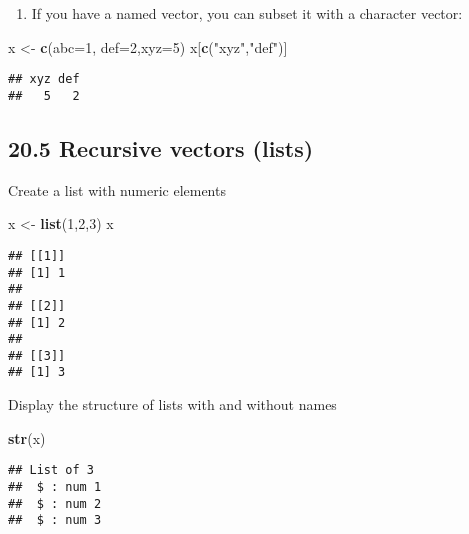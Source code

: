 \documentclass[
]{article}
\newenvironment{Shaded}{\begin{snugshade}}{\end{snugshade}}
\newcommand{\AttributeTok}[1]{\textcolor[rgb]{0.13,0.29,0.53}{#1}}
\newcommand{\DecValTok}[1]{\textcolor[rgb]{0.00,0.00,0.81}{#1}}
\newcommand{\FunctionTok}[1]{\textcolor[rgb]{0.13,0.29,0.53}{\textbf{#1}}}
\newcommand{\NormalTok}[1]{#1}
\newcommand{\OtherTok}[1]{\textcolor[rgb]{0.56,0.35,0.01}{#1}}
\newcommand{\StringTok}[1]{\textcolor[rgb]{0.31,0.60,0.02}{#1}}
\providecommand{\tightlist}{%
  \setlength{\itemsep}{0pt}\setlength{\parskip}{0pt}}
\begin{document}
\begin{enumerate}
\def\labelenumi{\arabic{enumi}.}
\setcounter{enumi}{2}
\tightlist
\item
  If you have a named vector, you can subset it with a character vector:
\end{enumerate}

\begin{Shaded}
\begin{Highlighting}[]
\NormalTok{x }\OtherTok{\textless{}{-}} \FunctionTok{c}\NormalTok{(}\AttributeTok{abc=}\DecValTok{1}\NormalTok{, }\AttributeTok{def=}\DecValTok{2}\NormalTok{,}\AttributeTok{xyz=}\DecValTok{5}\NormalTok{)}
\NormalTok{x[}\FunctionTok{c}\NormalTok{(}\StringTok{"xyz"}\NormalTok{,}\StringTok{"def"}\NormalTok{)]}
\end{Highlighting}
\end{Shaded}

\begin{verbatim}
## xyz def 
##   5   2
\end{verbatim}

\hypertarget{recursive-vectors-lists}{%
\subsection{20.5 Recursive vectors
(lists)}\label{recursive-vectors-lists}}

Create a list with numeric elements

\begin{Shaded}
\begin{Highlighting}[]
\NormalTok{x }\OtherTok{\textless{}{-}} \FunctionTok{list}\NormalTok{(}\DecValTok{1}\NormalTok{,}\DecValTok{2}\NormalTok{,}\DecValTok{3}\NormalTok{)}
\NormalTok{x}
\end{Highlighting}
\end{Shaded}

\begin{verbatim}
## [[1]]
## [1] 1
## 
## [[2]]
## [1] 2
## 
## [[3]]
## [1] 3
\end{verbatim}

Display the structure of lists with and without names

\begin{Shaded}
\begin{Highlighting}[]
\FunctionTok{str}\NormalTok{(x)}
\end{Highlighting}
\end{Shaded}

\begin{verbatim}
## List of 3
##  $ : num 1
##  $ : num 2
##  $ : num 3
\end{verbatim}
\end{document}
